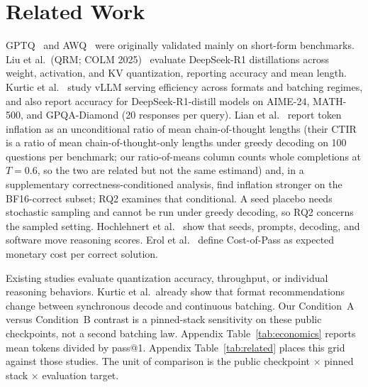 \documentclass[11pt,a4paper]{article}
\begin{document}
\section{Related Work}
GPTQ~\cite{frantar2022gptq} and AWQ~\cite{lin2023awq} were originally validated mainly on short-form benchmarks. Liu et al.\ (QRM; COLM 2025)~\cite{liu2025qrm} evaluate DeepSeek-R1 distillations across weight, activation, and KV quantization, reporting accuracy and mean length. Kurtic et al.~\cite{kurtic2025give} study vLLM serving efficiency across formats and batching regimes, and also report accuracy for DeepSeek-R1-distill models on AIME-24, MATH-500, and GPQA-Diamond (20 responses per query). Lian et al.~\cite{lian2026quantinflates} report token inflation as an unconditional ratio of mean chain-of-thought lengths (their CTIR is a ratio of mean chain-of-thought-only lengths under greedy decoding on 100 questions per benchmark; our ratio-of-means column counts whole completions at $T=0.6$, so the two are related but not the same estimand) and, in a supplementary correctness-conditioned analysis, find inflation stronger on the BF16-correct subset; RQ2 examines that conditional. A seed placebo needs stochastic sampling and cannot be run under greedy decoding, so RQ2 concerns the sampled setting. Hochlehnert et al.~\cite{hochlehnert2025sober} show that seeds, prompts, decoding, and software move reasoning scores. Erol et al.~\cite{erol2025costofpass} define Cost-of-Pass as expected monetary cost per correct solution.

Existing studies evaluate quantization accuracy, throughput, or individual reasoning behaviors. Kurtic et al.\ already show that format recommendations change between synchronous decode and continuous batching. Our Condition~A versus Condition~B contrast is a pinned-stack sensitivity on these public checkpoints, not a second batching law. Appendix Table~\ref{tab:economics} reports mean tokens divided by pass@1. Appendix Table~\ref{tab:related} places this grid against those studies. The unit of comparison is the public checkpoint $\times$ pinned stack $\times$ evaluation target.
\end{document}
